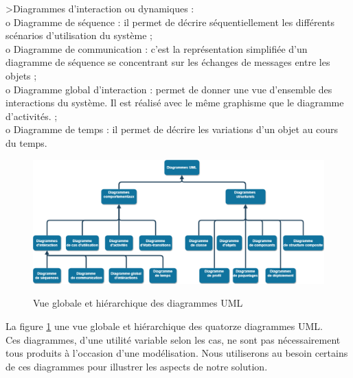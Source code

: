 \textgreater Diagrammes d’interaction ou dynamiques : \\
o Diagramme de séquence : il permet de décrire séquentiellement les différents scénarios d’utilisation du système ; \\
o Diagramme de communication : c’est la représentation simplifiée d'un diagramme de séquence se concentrant sur les échanges de messages entre les objets ; \\
o Diagramme global d'interaction : permet de donner une vue d’ensemble des interactions du système. Il est réalisé avec le même graphisme que le diagramme d’activités. ; \\
o Diagramme de temps : il permet de décrire les variations d'un objet au cours du temps. \\
\begin{figure}[h!]
	\centering
	\begin{minipage}{18cm}
		\centering
		{\includegraphics[height=0.27\textheight]{fig/Uml-Diagrams-overview.png}}
	\end{minipage}
	\caption{Vue globale et hiérarchique des diagrammes UML}
	\label{fig:7.1}
\end{figure}
La figure \ref{fig:7.1} une vue globale et hiérarchique des quatorze diagrammes UML.\\
Ces diagrammes, d'une utilité variable selon les cas, ne sont pas nécessairement tous produits à l'occasion d'une modélisation. Nous utiliserons au besoin certains de ces diagrammes pour illustrer les aspects de notre solution.

\clearpage 


